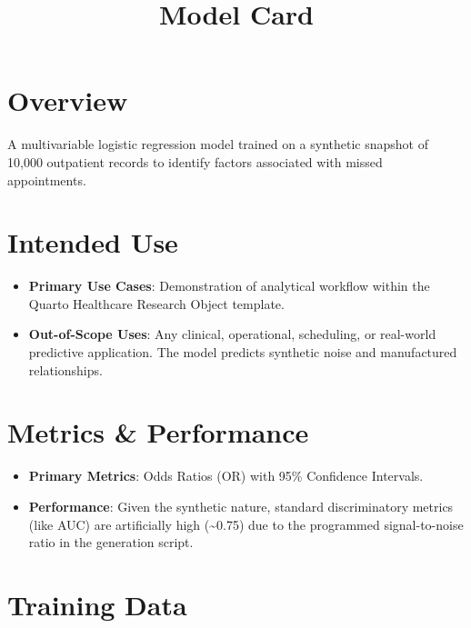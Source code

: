 \documentclass[
]{report}
\title{Model Card}
\author{}
\date{}
\providecommand{\tightlist}{%
  \setlength{\itemsep}{0pt}\setlength{\parskip}{0pt}}
\renewcommand*\contentsname{Table of contents}
\newcommand\contentsname{Table of contents}
\begin{document}
\maketitle

\renewcommand*\contentsname{Table of contents}
{
\hypersetup{linkcolor=}
\setcounter{tocdepth}{2}
\tableofcontents
}

\chapter{Overview}\label{overview}

A multivariable logistic regression model trained on a synthetic
snapshot of 10,000 outpatient records to identify factors associated
with missed appointments.

\chapter{Intended Use}\label{intended-use}

\begin{itemize}
\tightlist
\item
  \textbf{Primary Use Cases}: Demonstration of analytical workflow
  within the Quarto Healthcare Research Object template.
\item
  \textbf{Out-of-Scope Uses}: Any clinical, operational, scheduling, or
  real-world predictive application. The model predicts synthetic noise
  and manufactured relationships.
\end{itemize}

\chapter{Metrics \& Performance}\label{metrics-performance}

\begin{itemize}
\tightlist
\item
  \textbf{Primary Metrics}: Odds Ratios (OR) with 95\% Confidence
  Intervals.
\item
  \textbf{Performance}: Given the synthetic nature, standard
  discriminatory metrics (like AUC) are artificially high
  (\textasciitilde0.75) due to the programmed signal-to-noise ratio in
  the generation script.
\end{itemize}

\chapter{Training Data}\label{training-data}
\end{document}
